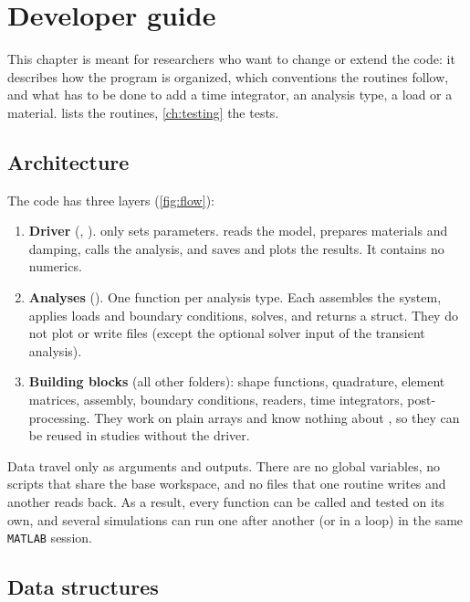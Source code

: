 \chapter{Developer guide}
\label{ch:dev}

This chapter is meant for researchers who want to change or extend the code: it
describes how the program is organized, which conventions the routines follow,
and what has to be done to add a time integrator, an analysis type, a load or a
material.  lists the routines, \cref{ch:testing} the tests.

\section{Architecture}

The code has three layers (\cref{fig:flow}):
\begin{enumerate}
  \item \textbf{Driver} (, ).
     only sets parameters.  reads the
    model, prepares materials and damping, calls the analysis, and saves and
    plots the results. It contains no numerics.
  \item \textbf{Analyses} (). One function per
    analysis type. Each assembles the system, applies loads and boundary
    conditions, solves, and returns a  struct. They do not plot or
    write files (except the optional solver input of the transient analysis).
  \item \textbf{Building blocks} (all other folders): shape functions,
    quadrature, element matrices, assembly, boundary conditions, readers, time
    integrators, post-processing. They work on plain arrays and know nothing
    about , so they can be reused in studies without the driver.
\end{enumerate}
Data travel only as arguments and outputs. There are no global variables, no
scripts that share the base workspace, and no files that one routine writes and
another reads back. As a result, every function can be called and tested on its
own, and several simulations can run one after another (or in a 
loop) in the same \texttt{MATLAB} session.

\section{Data structures}

